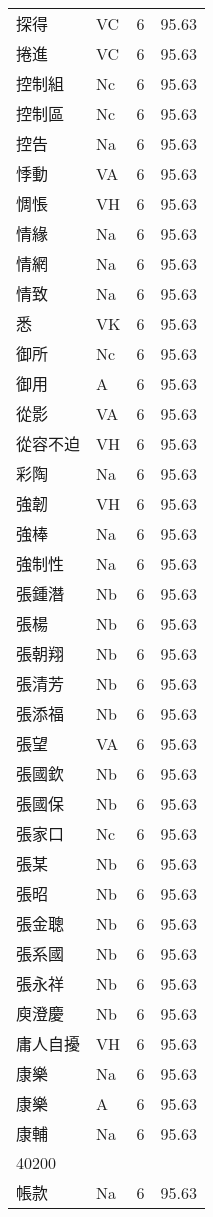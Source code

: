 \documentclass[twocolumn]{book}
\begin{document}
\begin{supertabular}{llrr}
探得 & VC & 6 &  95.63\\
捲進 & VC & 6 &  95.63\\
控制組 & Nc & 6 &  95.63\\
控制區 & Nc & 6 &  95.63\\
控告 & Na & 6 &  95.63\\
悸動 & VA & 6 &  95.63\\
惆悵 & VH & 6 &  95.63\\
情緣 & Na & 6 &  95.63\\
情網 & Na & 6 &  95.63\\
情致 & Na & 6 &  95.63\\
悉 & VK & 6 &  95.63\\
御所 & Nc & 6 &  95.63\\
御用 & A & 6 &  95.63\\
從影 & VA & 6 &  95.63\\
從容不迫 & VH & 6 &  95.63\\
彩陶 & Na & 6 &  95.63\\
強韌 & VH & 6 &  95.63\\
強棒 & Na & 6 &  95.63\\
強制性 & Na & 6 &  95.63\\
張鍾潛 & Nb & 6 &  95.63\\
張楊 & Nb & 6 &  95.63\\
張朝翔 & Nb & 6 &  95.63\\
張清芳 & Nb & 6 &  95.63\\
張添福 & Nb & 6 &  95.63\\
張望 & VA & 6 &  95.63\\
張國欽 & Nb & 6 &  95.63\\
張國保 & Nb & 6 &  95.63\\
張家口 & Nc & 6 &  95.63\\
張某 & Nb & 6 &  95.63\\
張昭 & Nb & 6 &  95.63\\
張金聰 & Nb & 6 &  95.63\\
張系國 & Nb & 6 &  95.63\\
張永祥 & Nb & 6 &  95.63\\
庾澄慶 & Nb & 6 &  95.63\\
庸人自擾 & VH & 6 &  95.63\\
康樂 & Na & 6 &  95.63\\
康樂 & A & 6 &  95.63\\
康輔 & Na & 6 &  95.63\\
40200\\
帳款 & Na & 6 &  95.63\\

\end{supertabular}
\end{document}
